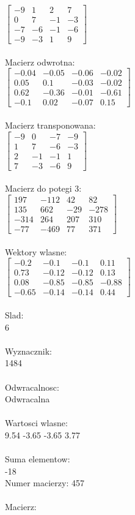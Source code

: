 \documentclass[a4paper,12pt]{article}
\begin{document}
$\begin{bmatrix} -9&1&2&7\\0&7&-1&-3\\-7&-6&-1&-6\\-9&-3&1&9 \end{bmatrix}$
\\
\\
Macierz odwrotna:\\

$\begin{bmatrix} -0.04&-0.05&-0.06&-0.02\\0.05&0.1&-0.03&-0.02\\0.62&-0.36&-0.01&-0.61\\-0.1&0.02&-0.07&0.15 \end{bmatrix}$
\\
\\
Macierz transponowana:\\

$\begin{bmatrix} -9&0&-7&-9\\1&7&-6&-3\\2&-1&-1&1\\7&-3&-6&9 \end{bmatrix}$
\\
\\
Macierz do potegi 3:\\

$\begin{bmatrix} 197&-112&42&82\\135&662&-29&-278\\-314&264&207&310\\-77&-469&77&371 \end{bmatrix}$
\\
\\
Wektory wlasne:\\

$\begin{bmatrix} -0.2&-0.1&-0.1&0.11\\0.73&-0.12&-0.12&0.13\\0.08&-0.85&-0.85&-0.88\\-0.65&-0.14&-0.14&0.44 \end{bmatrix}$
\\
\\
Slad:\\
6
\\
\\
Wyznacznik:\\
1484
\\
\\
Odwracalnosc:\\
Odwracalna
\\
\\
Wartosci wlasne:\\
9.54 -3.65 -3.65 3.77
\\
\\
Suma elementow:\\
-18
\\
\newpage
Numer macierzy:
457
\\
\\
Macierz:\\
\end{document}
